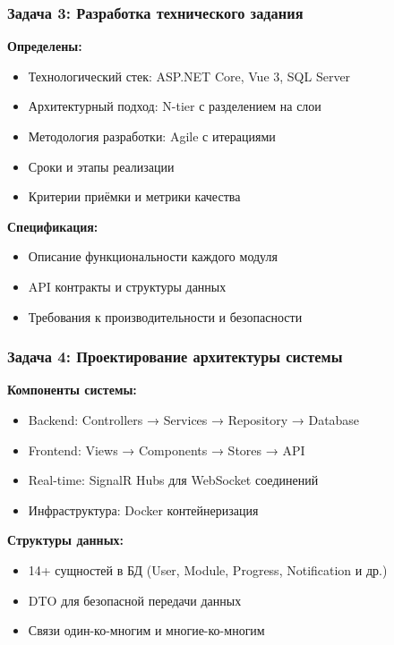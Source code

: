 \documentclass[aspectratio=43,11pt]{beamer}
\begin{document}
\begin{frame}
    \frametitle{Задача 3: Разработка технического задания}
    
    \textbf{Определены:}
    \begin{itemize}
        \item Технологический стек: ASP.NET Core, Vue 3, SQL Server
        \item Архитектурный подход: N-tier с разделением на слои
        \item Методология разработки: Agile с итерациями
        \item Сроки и этапы реализации
        \item Критерии приёмки и метрики качества
    \end{itemize}
    
    \bigskip
    
    \textbf{Спецификация:}
    \begin{itemize}
        \item Описание функциональности каждого модуля
        \item API контракты и структуры данных
        \item Требования к производительности и безопасности
    \end{itemize}
\end{frame}

\begin{frame}
    \frametitle{Задача 4: Проектирование архитектуры системы}
    
    \textbf{Компоненты системы:}
    \begin{itemize}
        \item Backend: Controllers → Services → Repository → Database
        \item Frontend: Views → Components → Stores → API
        \item Real-time: SignalR Hubs для WebSocket соединений
        \item Инфраструктура: Docker контейнеризация
    \end{itemize}
    
    \bigskip
    
    \textbf{Структуры данных:}
    \begin{itemize}
        \item 14+ сущностей в БД (User, Module, Progress, Notification и др.)
        \item DTO для безопасной передачи данных
        \item Связи один-ко-многим и многие-ко-многим
    \end{itemize}
\end{frame}
\end{document}
